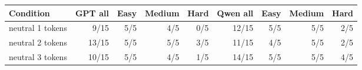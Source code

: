 \begin{tabular}{p{4.4cm}rrrrrrrr}
\toprule
Condition & GPT all & Easy & Medium & Hard & Qwen all & Easy & Medium & Hard\\
\midrule
neutral 1 tokens & 9/15 & 5/5 & 4/5 & 0/5 & 12/15 & 5/5 & 5/5 & 2/5\\
neutral 2 tokens & 13/15 & 5/5 & 5/5 & 3/5 & 11/15 & 4/5 & 5/5 & 2/5\\
neutral 3 tokens & 10/15 & 5/5 & 4/5 & 1/5 & 14/15 & 5/5 & 5/5 & 4/5\\
\bottomrule
\end{tabular}
